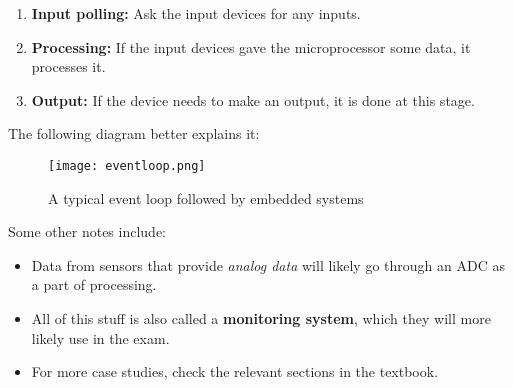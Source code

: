\documentclass[../main.tex]{subfiles}
\begin{document}
\begin{enumerate}
    \item \textbf{Input polling:} Ask the input devices for any inputs.
    \item \textbf{Processing:} If the input devices gave the microprocessor some data, it processes it.
    \item \textbf{Output:} If the device needs to make an output, it is done at this stage.
\end{enumerate}

The following diagram better explains it:

\begin{figure}[H]
    \centering
    \texttt{[image: eventloop.png]}
    \caption{A typical event loop followed by embedded systems}
    \label{fig:eventloop}
\end{figure}

Some other notes include:

\begin{itemize}
    \item Data from sensors that provide \emph{analog data} will likely go through an ADC as a part of processing.
    \item All of this stuff is also called a \textbf{monitoring system}, which they will more likely use in the exam.
    \item For more case studies, check the relevant sections in the textbook.
\end{itemize}
\end{document}

